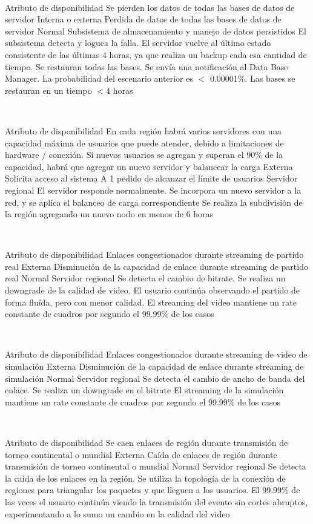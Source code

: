 ~

\escenario
{Atributo de disponibilidad}
{Se pierden los datos de todas las bases de datos de servidor}
{Interna o externa}
{Perdida de datos de todas las bases de datos de servidor}
{Normal}
{Subsistema de almacenamiento y manejo de datos persistidos}
{El subsistema detecta y loguea la falla. El servidor vuelve al último estado consistente de las últimas 4 horas, ya que realiza un backup cada esa cantidad de tiempo. Se restauran todas las bases. Se envía una notificación al Data Base Manager.}
{La probabilidad del escenario anterior es $<$ 0.00001\%. Las bases se restauran en un tiempo $< 4$ horas}

~

\escenario
{Atributo de disponibilidad}
{En cada región habrá varios servidores con una capacidad máxima de usuarios que puede atender, debido a limitaciones de hardware / conexión. Si nuevos usuarios se agregan y superan el 90\% de la capacidad, habrá que agregar un nuevo servidor y balancear la carga}
{Externa}
{Solicita acceso al sistema}
{A 1 pedido de alcanzar el límite de usuarios}
{Servidor regional}
{El servidor responde normalmente. Se incorpora un nuevo servidor a la red, y se aplica el balanceo de carga correspondiente}
{Se realiza la subdivisión de la región agregando un nuevo nodo en menos de 6 horas}

~

\escenario
{Atributo de disponibilidad}
{Enlaces congestionados durante streaming de partido real}
{Externa}
{Disminución de la capacidad de enlace durante streaming de partido real}
{Normal}
{Servidor regional}
{Se detecta el cambio de bitrate. Se realiza un downgrade de la calidad de video. El usuario continúa observando el partido de forma fluída, pero con menor calidad.}
{El streaming del video mantiene un rate constante de cuadros por segundo el 99.99\% de los casos}

~

\escenario
{Atributo de disponibilidad}
{Enlaces congestionados durante streaming de video de simulación}
{Externa}
{Disminución de la capacidad de enlace durante streaming de simulación}
{Normal}
{Servidor regional}
{Se detecta el cambio de ancho de banda del enlace. Se realiza un downgrade en el bitrate}
{El streaming de la simulación mantiene un rate constante de cuadros por segundo el 99.99\% de los casos}

~

\escenario
{Atributo de disponibilidad}
{Se caen enlaces de región durante transmisión de torneo continental o mundial}
{Externa}
{Caída de enlaces de región durante transmisión de torneo continental o mundial}
{Normal}
{Servidor regional}
{Se detecta la caída de los enlaces en la región. Se utiliza la topología de la conexión de regiones para triangular los paquetes y que lleguen a los usuarios.}
{El 99.99\% de las veces el usuario continúa viendo la transmisión del evento sin cortes abruptos, experimentando a lo sumo un cambio en la calidad del video}

